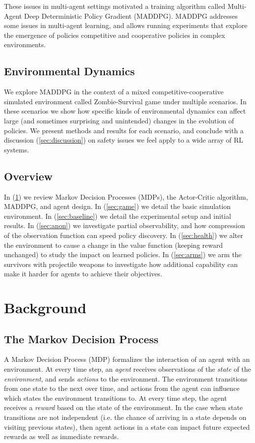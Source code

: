 \documentclass[11pt,a4paper]{article}
\begin{document}
These issues in multi-agent settings motivated a training algorithm called Multi-Agent Deep Deterministic Policy Gradient (MADDPG).
MADDPG addresses some issues in multi-agent learning, and allows running experiments that explore the emergence of policies competitive and cooperative policies in complex environments.

\subsection{Environmental Dynamics}

We explore MADDPG in the context of a mixed competitive-cooperative simulated environment called Zombie-Survival game under multiple scenarios.
In these scenarios we show how specific kinds of environmental dynamics can affect large (and sometimes surprising and unintended) changes in the evolution of policies.
We present methods and results for each scenario, and conclude with a discussion (\ref{sec:discussion}) on safety issues we feel apply to a wide array of RL systems.

\subsection{Overview}

In (\ref{sec:background}) we review Markov Decision Processes (MDPs), the Actor-Critic algorithm, MADDPG, and agent design.
In (\ref{sec:game}) we detail the basic simulation environment.
In (\ref{sec:baseline}) we detail the experimental setup and initial results.
In (\ref{sec:anon}) we investigate partial observability, and how compression of the observation function can speed policy discovery.
In (\ref{sec:health}) we alter the environment to cause a change in the value function (keeping reward unchanged) to study the impact on learned policies.
In (\ref{sec:arms}) we arm the survivors with projectile weapons to investigate how additional capability can make it harder for agents to achieve their objectives.

\section{Background}
\label{sec:background}

\subsection{The Markov Decision Process}

A Markov Decision Process (MDP) formalizes the interaction of an agent with an environment.
At every time step, an \emph{agent} receives observations of the \emph{state} of the \emph{environment}, and sends \emph{actions} to the environment.
The environment transitions from one state to the next over time, and actions from the agent can influence which states the environment transitions to.
At every time step, the agent receives a \emph{reward} based on the state of the environment.
In the case when state transitions are not independent (i.e. the chance of arriving in a state depends on visiting previous states), then agent actions in a state can impact future expected rewards as well as immediate rewards.
\end{document}
